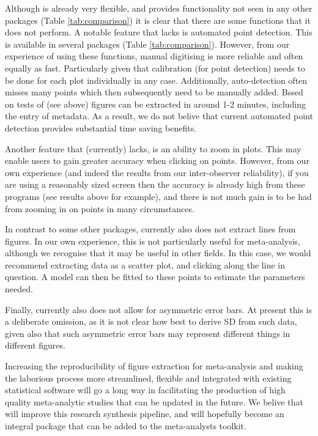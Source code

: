 \documentclass[article]{jss}
\begin{document}
Although  is already very flexible, and provides functionality not seen in any other packages (Table \ref{tab:comparison}) it is clear that there are some functions that it does not perform. A notable feature that  lacks is automated point detection. This is available in several packages (Table \ref{tab:comparison}). However, from our experience of using these functions, manual digitising is more reliable and often equally as fast. Particularly given that calibration (for point detection) needs to be done for each plot individually in any case. Additionally, auto-detection often misses many points which then subsequently need to be manually added. Bssed on tests of  (see above) figures can be extracted in around 1-2 minutes, including the entry of metadata. As a result, we do not belive that current automated point detection provides substantial time saving benefits.

Another feature that  (currently) lacks, is an ability to zoom in plots. This may enable users to gain greater accuracy when clicking on points. However, from our own experience (and indeed the results from our inter-observer reliability), if you are using a reasonably sized screen then the accuracy is already high from these programs (see results above for example), and there is not much gain is to be had from zooming in on points in many circumstances.

In contrast to some other packages,  currently also does not extract lines from figures. In our own experience, this is not particularly useful for meta-analysis, although we recognise that it may be useful in other fields. In this case, we would recommend extracting data as a scatter plot, and clicking along the line in question. A model can then be fitted to these points to estimate the parameters needed.

Finally,  currently also does not allow for asymmetric error bars. At present this is a deliberate omission, as it is not clear how best to derive SD from such data, given also that such asymmetric error bars may represent different things in different figures. 

Increasing the reproducibility of figure extraction for meta-analysis and making the laborious process more streamlined, flexible and integrated with existing statistical software will go a long way in facilitating the production of high quality meta-analytic studies that can be updated in the future. We belive that  will improve this research synthesis pipeline, and will hopefully become an integral package that can be added to the meta-analysts toolkit.
\end{document}
